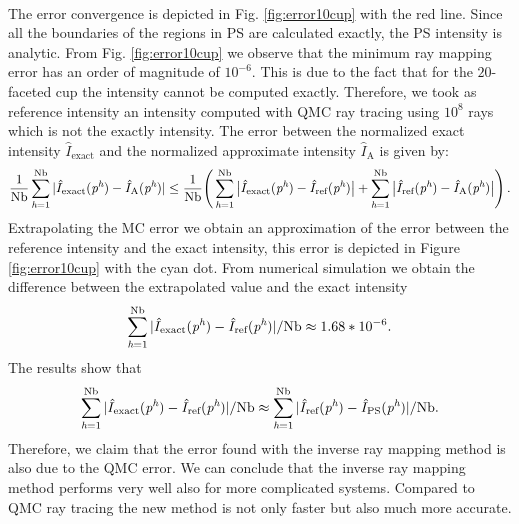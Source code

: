 \\ \indent The error convergence is depicted in Fig. \ref{fig:error10cup} with the red line.
Since all the boundaries of the regions in PS are calculated exactly, the PS intensity is analytic.
From Fig. \ref{fig:error10cup} we observe that the minimum ray mapping error has an order of magnitude of $10^{-6}$.
This is due to the fact that for the $20$-faceted cup the intensity cannot be computed exactly. 
Therefore, we took as reference intensity an intensity computed with QMC ray tracing using $10^8$ rays which is not the exactly intensity.
The error between the normalized exact intensity $\hat{I}_{\textrm{exact}}$ and the normalized approximate intensity $\hat{I}_{\textrm{A}}$ is given by:
\begin{equation}
\frac{1}{\textrm{Nb}}\sum_{\textit{h} = 1}^{\textrm{Nb}}| \hat{I}_{\textrm{exact}}(\textit{p}^{\textit{h}}) - \hat{I}_{\textrm{A}}(\textit{p}^{\textit{h}})| \leq
\frac{1}{\textrm{Nb}}\Bigg(\sum_{\textit{h} = 1}^{\textrm{Nb}}\big| \hat{I}_{\textrm{exact}}(\textit{p}^{\textit{h}}) - \hat{I}_{\textrm{ref}}(\textit{p}^{\textit{h}})\big| +
\sum_{\textit{h} = 1}^{\textrm{Nb}}\big| \hat{I}_{\textrm{ref}}(\textit{p}^{\textit{h}}) - \hat{I}_{\textrm{A}}(\textit{p}^{\textit{h}})\big|\Bigg)\,.
\end{equation}
Extrapolating the MC error we obtain an approximation of the error between the reference intensity and the exact intensity,
this error is depicted in Figure \ref{fig:error10cup} with the cyan dot.
From numerical simulation we obtain the difference between the extrapolated value and the exact intensity 
\begin{equation*}\sum_{\textit{h} = 1}^{\textrm{Nb}}| \hat{I}_{\textrm{exact}}(\textit{p}^{\textit{h}}) - \hat{I}_{\textrm{ref}}(\textit{p}^{\textit{h}})|/\textrm{Nb}\approx 1.68*10^{-6}. \end{equation*}
The results show that 
\begin{equation*}
\sum_{\textit{h} = 1}^{\textrm{Nb}}| \hat{I}_{\textrm{exact}}(\textit{p}^{\textit{h}}) - \hat{I}_{\textrm{ref}}(\textit{p}^{\textit{h}})|/\textrm{Nb}
\approx \sum_{\textit{h} = 1}^{\textrm{Nb}}|\hat{I}_{\textrm{ref}}(\textit{p}^{\textit{h}}) - \hat{I}_{\textrm{PS}}(\textit{p}^{\textit{h}})|/\textrm{Nb}.
\end{equation*}
Therefore, we claim that the error found with the inverse ray mapping method is also due to the QMC error.
We can conclude that the inverse ray mapping method performs very well also for more complicated systems.
Compared to QMC ray tracing the new method is not only faster but also much more accurate.
